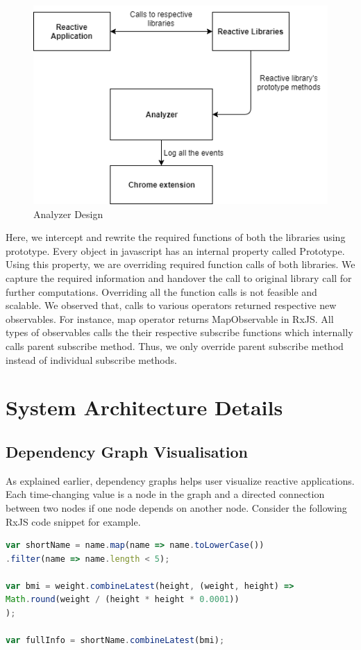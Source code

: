 \begin{figure}[!h]
	\centering
	\includegraphics[scale=0.5,trim=0 0 0 0]{images/analyzer-design.png}
	\caption{Analyzer Design}
	\label{fig:analyzer-design}
\end{figure}

Here, we intercept and rewrite the required functions of both the libraries using prototype\cite{prototype}. Every object in javascript has an internal property called Prototype. Using this property, we are overriding required function calls of both libraries. We capture the required information and handover the call to original library call for further computations. Overriding all the function calls is not feasible and scalable. We observed that, calls to various operators returned respective new observables. For instance, map operator returns MapObservable in RxJS. All types of observables calls the their respective subscribe functions which internally calls parent subscribe method. Thus, we only override parent subscribe method instead of individual subscribe methods. 

\section{System Architecture Details}
\subsection{Dependency Graph Visualisation}
As explained earlier, dependency graphs helps user visualize reactive applications. Each time-changing value is a node in the graph and a directed connection between two nodes if one node depends on another node. Consider the following RxJS code snippet for example. 
\begin{lstlisting}[language=JavaScript, caption=RxJS code example, label={lst:rxjs-code-example}]
var shortName = name.map(name => name.toLowerCase())
.filter(name => name.length < 5);

var bmi = weight.combineLatest(height, (weight, height) =>
Math.round(weight / (height * height * 0.0001))
);

var fullInfo = shortName.combineLatest(bmi);
\end{lstlisting}

